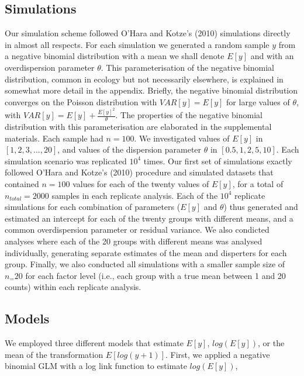\documentclass[]{article}
\begin{document}
\subsection{Simulations}\label{simulations}

Our simulation scheme followed O'Hara and Kotze's (2010) simulations
directly in almost all respects. For each simulation we generated a
random sample \(y\) from a negative binomial distribution with a mean we
shall denote \(E[y]\) and with an overdispersion parameter \(\theta\).
This parameterisation of the negative binomial distribution, common in
ecology but not necessarily elsewhere, is explained in somewhat more
detail in the appendix. Briefly, the negative binomial distribution
converges on the Poisson distribution with \(VAR[y]=E[y]\) for large
values of \(\theta\), with \(VAR[y]=E[y]+\frac{E[y]^2}{\theta}\). The
properties of the negative binomial distribution with this
parameterisation are elaborated in the supplemental materials. Each
sample had \(n = 100\). We investigated values of \(E[y]\) in
\([1,2,3,...,20]\), and values of the dispersion parameter \(\theta\) in
\([0.5,1,2,5,10]\). Each simulation scenario was replicated \(10^4\)
times. Our first set of simulations exactly followed O'Hara and Kotze's
(2010) procedure and simulated datasets that contained \(n = 100\)
values for each of the twenty values of \(E[y]\), for a total of
\(n_{total}=2000\) samples in each replicate analysis. Each of the
\(10^4\) replicate simulations for each combination of parameters
(\(E[y]\) and \(\theta\)) thus generated and estimated an intercept for
each of the twenty groups with different means, and a common
overdispersion parameter or residual variance. We also condicted
analyses where each of the 20 groups with different means was analysed
individually, generating separate estimates of the mean and disperters
for each group. Finally, we also conducted all simulations with a
smaller sample size of \(n_=20\) for each factor level (i.e., each group
with a true mean between 1 and 20 counts) within each replicate
analysis.

\subsection{Models}\label{models}

We employed three different models that estimate \(E[y]\),
\(log(E[y])\), or the mean of the transformation \(E[log(y+1)]\). First,
we applied a negative binomial GLM with a log link function to estimate
\(log(E[y])\),
\end{document}

